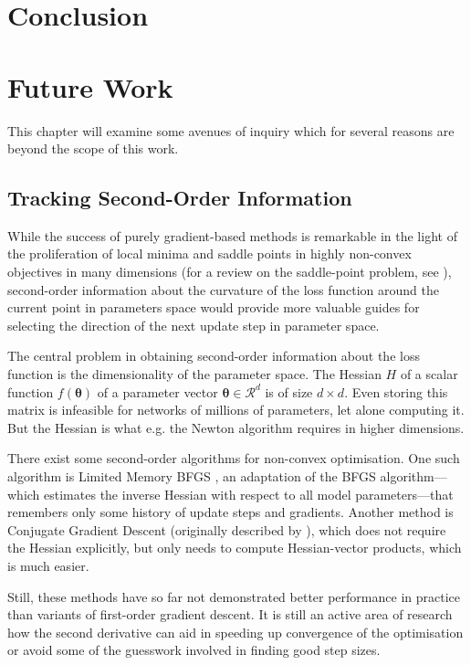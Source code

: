 \chapter{Conclusion}%

\chapter{Future Work}%
\label{cha:future_work}

This chapter will examine some avenues of inquiry which for several reasons are
beyond the scope of this work.

\section{Tracking Second-Order Information}%
\label{sec:tracking_second_order_information}

While the success of purely gradient-based methods is remarkable in the
light of the proliferation of local minima and saddle points in highly
non-convex objectives in many dimensions (for a review on the saddle-point problem, see
\citet{dauphin2014identifying}), second-order information about the curvature of
the loss function around the current point in parameters space would provide
more valuable guides for selecting the direction of the next update step in
parameter space.

The central problem in obtaining second-order information about the loss
function is the dimensionality of the parameter space. The Hessian $H$ of a
scalar function $f(\boldsymbol{\theta})$ of a parameter vector $\boldsymbol{\theta} \in
\mathcal{R}^d$ is of size $d\times d$. Even storing this matrix is infeasible
for networks of millions of parameters, let alone computing it.
But the Hessian is what e.g. the Newton algorithm requires in higher dimensions.

There exist some second-order algorithms for non-convex optimisation.  One such
algorithm is Limited Memory BFGS \citep{liu1989limited}, an adaptation of the
BFGS algorithm---which estimates the inverse Hessian with respect to all model
parameters---that remembers only some history of update steps and gradients.
Another method is Conjugate Gradient Descent (originally described by
\citet{fletcher1964function}), which does not require the Hessian explicitly,
but only needs to compute Hessian-vector products, which is much easier.

Still, these methods have so far not demonstrated better performance in practice than
variants of first-order gradient descent. It is still an active area of research
how the second derivative can aid in speeding up convergence of the optimisation
or avoid some of the guesswork involved in finding good step sizes.


